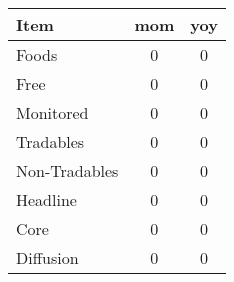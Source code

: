 \documentclass[article,crop=false]{standalone}%
\begin{document}
%
\normalsize%
\setlength{\tabcolsep}{0.2cm}%
\begin{tabular}[b]{l | c | c}%
\hline%
\textbf{Item}&\textbf{mom}&\textbf{yoy}\\%
\hline%
\hline%
\rowcolor{lightgray}%
Foods&0&0\\%
\rowcolor{white}%
Free&0&0\\%
\rowcolor{lightgray}%
Monitored&0&0\\%
\rowcolor{white}%
Tradables&0&0\\%
\rowcolor{lightgray}%
Non{-}Tradables&0&0\\%
\rowcolor{white}%
Headline&0&0\\%
\rowcolor{lightgray}%
Core&0&0\\%
\rowcolor{white}%
Diffusion&0&0\\%
\hline%
\end{tabular}%
\end{document}
